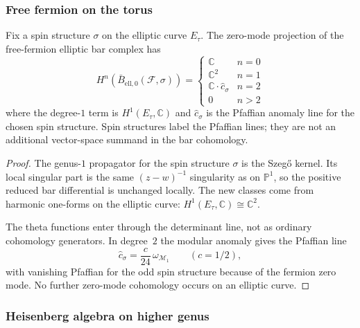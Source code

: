 \subsubsection{Free fermion on the torus}

\begin{theorem}\label{thm:elliptic-fermion-bar}
Fix a spin structure $\sigma$ on the elliptic curve $E_\tau$.
The zero-mode projection of the free-fermion elliptic bar complex has
\[
H^n(\bar{B}_{\text{ell},0}(\mathcal{F},\sigma)) = \begin{cases}
\mathbb{C} & n = 0 \\
\mathbb{C}^2 & n = 1 \\
\mathbb{C} \cdot \hat{c}_\sigma & n = 2 \\
0 & n > 2
\end{cases}
\]
where the degree-$1$ term is $H^1(E_\tau,\mathbb C)$ and
$\hat c_\sigma$ is the Pfaffian anomaly line for the chosen spin
structure. Spin structures label the Pfaffian lines; they are not an
additional vector-space summand in the bar cohomology.
\end{theorem}

\begin{proof}
The genus-$1$ propagator for the spin structure $\sigma$ is the
Szeg\H{o} kernel. Its local singular part is the same
$(z-w)^{-1}$ singularity as on $\mathbb P^1$, so the positive
reduced bar differential is unchanged locally. The new classes come
from harmonic one-forms on the elliptic curve:
$H^1(E_\tau,\mathbb C)\cong \mathbb C^2$.

The theta functions enter through the determinant line, not as
ordinary cohomology generators. In degree~$2$ the modular anomaly
gives the Pfaffian line
\[
\hat{c}_\sigma = \frac{c}{24}\,\omega_{\mathcal{M}_1}
\qquad (c=1/2),
\]
with vanishing Pfaffian for the odd spin structure because of the
fermion zero mode. No further zero-mode cohomology occurs on an
elliptic curve.
\end{proof}

\subsubsection{Heisenberg algebra on higher genus}


